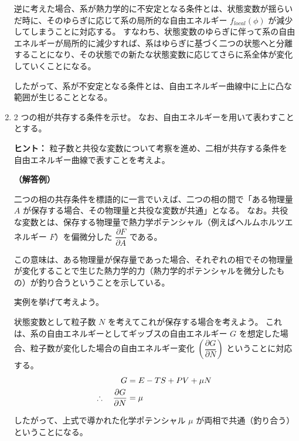\documentclass[uplatex,dvipdfmx,a4paper,11pt]{jsarticle}
\newcommand{\difp}[2]{\dfrac{\partial #1}{\partial #2}}
\begin{document}
\begin{enumerate}
逆に考えた場合、系が熱力学的に不安定となる条件とは、状態変数が揺らいだ時に、そのゆらぎに応じて系の局所的な自由エネルギー $f_{local} (\phi)$ が減少してしまうことに対応する。
すなわち、状態変数のゆらぎに伴って系の自由エネルギーが局所的に減少すれば、系はゆらぎに基づく二つの状態へと分離することになり、その状態での新たな状態変数に応じてさらに系全体が変化していくことになる。

したがって、系が不安定となる条件とは、自由エネルギー曲線中に上に凸な範囲が生じることとなる。
\vspace{10pt}

\color{black}

\newpage

\item
2 つの相が共存する条件を示せ。
なお、自由エネルギーを用いて表わすこととする。

\begin{itembox}[l]{{\bf ヒント：}}
粒子数と共役な変数について考察を進め、二相が共存する条件を自由エネルギー曲線で表すことを考えよ。
\end{itembox}

\vspace{10pt}
{\bf （解答例）}

二つの相の共存条件を標語的に一言でいえば、二つの相の間で「ある物理量 $A$ が保存する場合、その物理量と共役な変数が共通」となる。
なお。共役な変数とは、保存する物理量で熱力学ポテンシャル（例えばヘルムホルツエネルギー $F$）を偏微分した $\difp{F}{A}$ である。

この意味は、ある物理量が保存量であった場合、それぞれの相でその物理量が変化することで生じた熱力学的力（熱力学的ポテンシャルを微分したもの）が釣り合うということを示している。


実例を挙げて考えよう。

状態変数として粒子数 $N$ を考えてこれが保存する場合を考えよう。
これは、系の自由エネルギーとしてギッブスの自由エネルギー $G$ を想定した場合、粒子数が変化した場合の自由エネルギー変化 $\left(\difp{G}{N} \right)$ ということに対応する。
\begin{align*}
G &= E - TS + PV + \mu N \notag \\
\therefore \quad \difp{G}{N} &= \mu
\end{align*}

したがって、上式で導かれた化学ポテンシャル $\mu$ が両相で共通（釣り合う）ということになる。



\end{enumerate}
\end{document}
